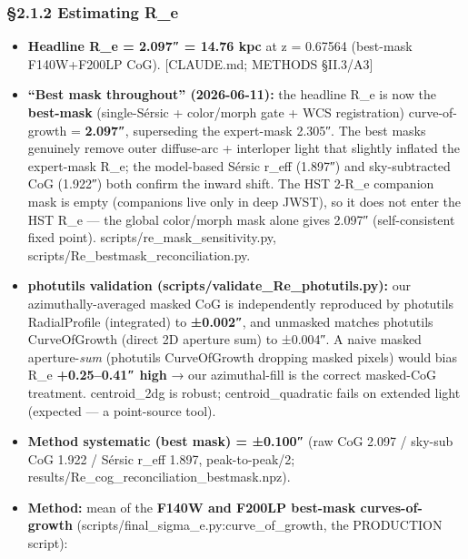 \documentclass[
]{article}
\providecommand{\tightlist}{%
  \setlength{\itemsep}{0pt}\setlength{\parskip}{0pt}}
\newcommand{\BreakablePath}[1]{{\ttfamily\sloppy #1}}
\begin{document}
\hypertarget{estimating-r_e}{%
\subsubsection{§2.1.2 Estimating R\_e}\label{estimating-r_e}}

\begin{itemize}
\tightlist
\item
  \textbf{Headline R\_e = 2.097″ = 14.76 kpc} at z = 0.67564 (best-mask
  F140W+F200LP CoG). {[}CLAUDE.md; METHODS §II.3/A3{]}
\item
  \textbf{``Best mask throughout'' (2026-06-11):} the headline R\_e is
  now the \textbf{best-mask} (single-Sérsic + color/morph gate + WCS
  registration) curve-of-growth = \textbf{2.097″}, superseding the
  expert-mask 2.305″. The best masks genuinely remove outer diffuse-arc
  + interloper light that slightly inflated the expert-mask R\_e; the
  model-based Sérsic r\_eff (1.897″) and sky-subtracted CoG (1.922″)
  both confirm the inward shift. The HST 2-R\_e companion mask is empty
  (companions live only in deep JWST), so it does not enter the HST R\_e
  --- the global color/morph mask alone gives 2.097″ (self-consistent
  fixed point).
  \BreakablePath{scripts/\discretionary{}{}{}re\_\discretionary{}{}{}mask\_\discretionary{}{}{}sensitivity.\discretionary{}{}{}py},
  \BreakablePath{scripts/\discretionary{}{}{}Re\_\discretionary{}{}{}bestmask\_\discretionary{}{}{}reconciliation.\discretionary{}{}{}py}.
\item
  \textbf{photutils validation
  (\BreakablePath{scripts/\discretionary{}{}{}validate\_\discretionary{}{}{}Re\_\discretionary{}{}{}photutils.\discretionary{}{}{}py}):}
  our azimuthally-averaged masked CoG is independently reproduced by
  photutils \BreakablePath{RadialProfile} (integrated) to
  \textbf{±0.002″}, and unmasked matches photutils
  \BreakablePath{CurveOfGrowth} (direct 2D aperture sum) to ±0.004″. A
  naive masked aperture-\emph{sum} (photutils
  \BreakablePath{CurveOfGrowth} dropping masked pixels) would bias R\_e
  \textbf{+0.25--0.41″ high} → our azimuthal-fill is the correct
  masked-CoG treatment.
  \BreakablePath{centroid\_\discretionary{}{}{}2dg} is robust;
  \BreakablePath{centroid\_\discretionary{}{}{}quadratic} fails on
  extended light (expected --- a point-source tool).
\item
  \textbf{Method systematic (best mask) = ±0.100″} (raw CoG 2.097 /
  sky-sub CoG 1.922 / Sérsic r\_eff 1.897, peak-to-peak/2;
  \BreakablePath{results/\discretionary{}{}{}Re\_\discretionary{}{}{}cog\_\discretionary{}{}{}reconciliation\_\discretionary{}{}{}bestmask.\discretionary{}{}{}npz}).
\item
  \textbf{Method:} mean of the \textbf{F140W and F200LP best-mask
  curves-of-growth}
  (\BreakablePath{scripts/\discretionary{}{}{}final\_\discretionary{}{}{}sigma\_\discretionary{}{}{}e.\discretionary{}{}{}py:curve\_\discretionary{}{}{}of\_\discretionary{}{}{}growth},
  the PRODUCTION script):


\end{itemize}
\end{document}
